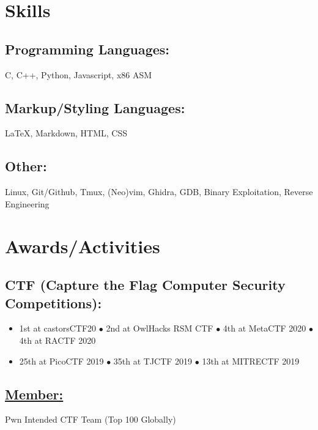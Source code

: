 \documentclass{article}
\begin{document}
\section{Skills}
\subsection{Programming Languages:}
C, C++, Python, Javascript, x86 ASM
\subsection{Markup/Styling Languages:}
{\LaTeX}, Markdown, HTML, CSS
\subsection{Other:}
Linux, Git/Github, Tmux, (Neo)vim, Ghidra, GDB, Binary Exploitation, Reverse Engineering

\section{Awards/Activities}
\subsection{CTF (Capture the Flag Computer Security Competitions):}
\begin{itemize}
    \item 1st at castorsCTF20 $\bullet$ 2nd at OwlHacks RSM CTF $\bullet$ 4th at MetaCTF 2020 $\bullet$ 4th at RACTF 2020 
    \item 25th at PicoCTF 2019 $\bullet$ 35th at TJCTF 2019 $\bullet$ 13th at MITRECTF 2019 
\end{itemize} 
 \subsection{\href{https://ctftime.org/user/66839}{Member: }} Pwn Intended CTF Team (Top 100 Globally)
\end{document}
